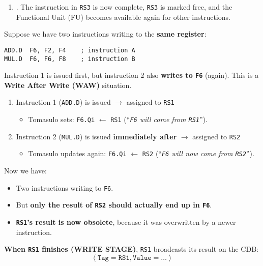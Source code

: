 \begin{enumerate}
    \item {}. The instruction in \texttt{RS3} is now complete, \texttt{RS3} is marked free, and the Functional Unit (FU) becomes available again for other instructions.
\end{enumerate}

\begin{examplebox}
    Suppose we have two instructions writing to the \textbf{same register}:
    \begin{lstlisting}[language=unknown]
ADD.D  F6, F2, F4    ; instruction A
MUL.D  F6, F6, F8    ; instruction B\end{lstlisting}
    Instruction 1 is issued first, but instruction 2 also \textbf{writes to \texttt{F6}} (again). This is a \textbf{Write After Write (WAW)} situation.
    \begin{enumerate}
        \item Instruction 1 (\texttt{ADD.D}) is issued $\rightarrow$ assigned to \texttt{RS1}
        \begin{itemize}
            \item Tomasulo sets: \texttt{F6.Qi} $\leftarrow$ \texttt{RS1} (``\emph{\texttt{F6} will come from \texttt{RS1}}'').
        \end{itemize}
        \item Instruction 2 (\texttt{MUL.D}) is issued \textbf{immediately after} $\rightarrow$ assigned to \texttt{RS2}
        \begin{itemize}
            \item Tomasulo updates again: \texttt{F6.Qi} $\leftarrow$ \texttt{RS2} (``\emph{\texttt{F6} will now come from \texttt{RS2}}'').
        \end{itemize}
    \end{enumerate}
    Now we have:
    \begin{itemize}
        \item Two instructions writing to \texttt{F6}.
        \item But \textbf{only the result of \texttt{RS2} should actually end up in \texttt{F6}}.
        \item \textbf{\texttt{RS1}'s result is now obsolete}, because it was overwritten by a newer instruction.
    \end{itemize}
    \textbf{When \texttt{RS1} finishes (WRITE STAGE)}, \texttt{RS1} broadcasts its result on the CDB:
    \begin{equation*}
        \left\langle \texttt{Tag} = \texttt{RS1}, \texttt{Value} = \dots \right\rangle

\end{equation*}
\end{examplebox}
